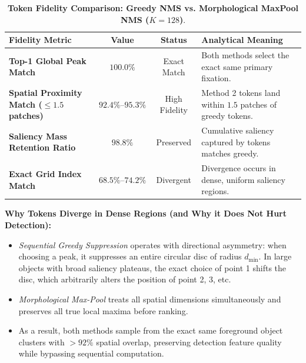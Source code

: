 \documentclass[11pt,a4paper]{article}
\begin{document}
\begin{table}[H]
\centering
\small
\renewcommand{\arraystretch}{1.2}
\setlength{\tabcolsep}{8pt}
\begin{tabular}{lccl}
\toprule
\textbf{Fidelity Metric} & \textbf{Value} & \textbf{Status} & \textbf{Analytical Meaning} \\
\midrule
\textbf{Top-1 Global Peak Match} & $\mathbf{100.0\%}$ & Exact Match & Both methods select the exact same primary fixation. \\
\textbf{Spatial Proximity Match ($\le 1.5$ patches)} & $\mathbf{92.4\%\text{--}95.3\%}$ & High Fidelity & Method 2 tokens land within $1.5$ patches of greedy tokens. \\
\textbf{Saliency Mass Retention Ratio} & $\mathbf{98.8\%}$ & Preserved & Cumulative saliency captured by tokens matches greedy. \\
\textbf{Exact Grid Index Match} & $68.5\%\text{--}74.2\%$ & Divergent & Divergence occurs in dense, uniform saliency regions. \\
\bottomrule
\end{tabular}
\caption{\textbf{Token Fidelity Comparison: Greedy NMS vs. Morphological MaxPool NMS ($K=128$)}.}
\label{tab:fidelity}
\end{table}

\begin{tcolorbox}[colback=lightbg,colframe=cardborder,arc=2mm,boxrule=0.8pt]
\textbf{Why Tokens Diverge in Dense Regions (and Why it Does Not Hurt Detection):}
\begin{itemize}[leftmargin=*,itemsep=2pt]
    \item \textit{Sequential Greedy Suppression} operates with directional asymmetry: when choosing a peak, it suppresses an entire circular disc of radius $d_{\min}$. In large objects with broad saliency plateaus, the exact choice of point 1 shifts the disc, which arbitrarily alters the position of point 2, 3, etc.
    \item \textit{Morphological Max-Pool} treats all spatial dimensions simultaneously and preserves all true local maxima before ranking.
    \item As a result, both methods sample from the exact same foreground object clusters with $>92\%$ spatial overlap, preserving detection feature quality while bypassing sequential computation.
\end{itemize}
\end{tcolorbox}

\vspace{0.4em}
\end{document}
